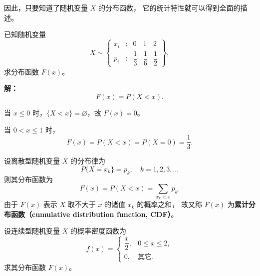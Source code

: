 因此，只要知道了随机变量 $X$ 的分布函数，
它的统计特性就可以得到全面的描述。
\begin{example}
已知随机变量 
\[
X \sim 
\begin{Bmatrix}
x_i &:& 0 & 1 & 2 \\[2pt]
p_i &:& \dfrac{1}{3} & \dfrac{1}{6} & \dfrac{1}{2}
\end{Bmatrix},
\]
求分布函数 \(F(x)\)。

\textbf{解：}
\[
F(x) = P(X < x).
\]

当 \(x \le 0\) 时，\(\{X < x\} = \varnothing\)，故 \(F(x) = 0。\)

当 \(0 < x \le 1\) 时，
\[
F(x) = P(X < x) = P(X = 0) = \frac{1}{3}.
\]
\begin{center}
\end{center}
\end{example}
\begin{proposition}[离散型随机变量的分布函数]
设离散型随机变量 $X$ 的分布律为
\[
P\{X = x_k\} = p_k, \quad k = 1, 2, 3, \ldots
\]
则其分布函数为
\[
F(x) = P(X < x) = \sum_{x_k < x} p_k.
\]
由于 $F(x)$ 表示 $X$ 取不大于 $x$ 的诸值 $x_k$ 的概率之和，
故又称 $F(x)$ 为\textbf{累计分布函数（cumulative distribution function, CDF）}。
\end{proposition}
\begin{example}
设连续型随机变量 $X$ 的概率密度函数为
\[
f(x) =
\begin{cases}
\dfrac{x}{2}, & 0 \le x \le 2, \\[4pt]
0, & \text{其它}.
\end{cases}
\]
求其分布函数 $F(x)$。
\end{example}

